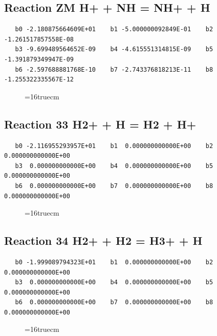 \documentclass[12pt,dvipdfm]{article}
\begin{document}
\subsection{
Reaction ZM H+ + NH = NH+ + H}
\begin{small}\begin{verbatim}
   b0 -2.180875664609E+01    b1 -5.000000092849E-01    b2 -1.261517857558E-08
   b3 -9.699489564652E-09    b4 -4.615551314815E-09    b5 -1.391879349947E-09
   b6 -2.597688881768E-10    b7 -2.743376818213E-11    b8 -1.255322335567E-12
   \end{verbatim}\end{small}
\begin{figure}[h!]
\label{n2rates}
\epsfxsize=16truecm
\end{figure}
\newpage

\subsection{
Reaction 33 H2+ + H = H2 + H+}
\begin{small}\begin{verbatim}
   b0 -2.116955293957E+01    b1  0.000000000000E+00    b2  0.000000000000E+00
   b3  0.000000000000E+00    b4  0.000000000000E+00    b5  0.000000000000E+00
   b6  0.000000000000E+00    b7  0.000000000000E+00    b8  0.000000000000E+00
   \end{verbatim}\end{small}
\begin{figure}[h!]
\label{n2rates}
\epsfxsize=16truecm
\end{figure}
\newpage

\subsection{
Reaction 34 H2+ + H2 = H3+ + H}
\begin{small}\begin{verbatim}
   b0 -1.999089794323E+01    b1  0.000000000000E+00    b2  0.000000000000E+00
   b3  0.000000000000E+00    b4  0.000000000000E+00    b5  0.000000000000E+00
   b6  0.000000000000E+00    b7  0.000000000000E+00    b8  0.000000000000E+00
   \end{verbatim}\end{small}
\begin{figure}[h!]
\label{n2rates}
\epsfxsize=16truecm
\end{figure}
\newpage
\end{document}
